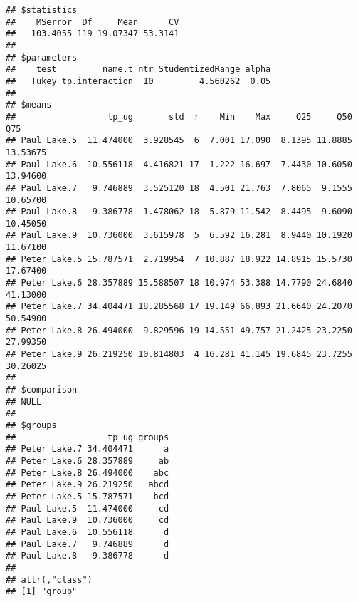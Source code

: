 \documentclass[
]{article}
\newenvironment{Shaded}{\begin{snugshade}}{\end{snugshade}}
\newcommand{\CommentTok}[1]{\textcolor[rgb]{0.56,0.35,0.01}{\textit{#1}}}
\newcommand{\DataTypeTok}[1]{\textcolor[rgb]{0.13,0.29,0.53}{#1}}
\newcommand{\FloatTok}[1]{\textcolor[rgb]{0.00,0.00,0.81}{#1}}
\newcommand{\KeywordTok}[1]{\textcolor[rgb]{0.13,0.29,0.53}{\textbf{#1}}}
\newcommand{\NormalTok}[1]{#1}
\newcommand{\OperatorTok}[1]{\textcolor[rgb]{0.81,0.36,0.00}{\textbf{#1}}}
\newcommand{\OtherTok}[1]{\textcolor[rgb]{0.56,0.35,0.01}{#1}}
\newcommand{\StringTok}[1]{\textcolor[rgb]{0.31,0.60,0.02}{#1}}
\begin{document}
\begin{Shaded}
\end{Shaded}

\begin{verbatim}
## $statistics
##    MSerror  Df     Mean      CV
##   103.4055 119 19.07347 53.3141
## 
## $parameters
##    test         name.t ntr StudentizedRange alpha
##   Tukey tp.interaction  10         4.560262  0.05
## 
## $means
##                  tp_ug       std  r    Min    Max     Q25     Q50      Q75
## Paul Lake.5  11.474000  3.928545  6  7.001 17.090  8.1395 11.8885 13.53675
## Paul Lake.6  10.556118  4.416821 17  1.222 16.697  7.4430 10.6050 13.94600
## Paul Lake.7   9.746889  3.525120 18  4.501 21.763  7.8065  9.1555 10.65700
## Paul Lake.8   9.386778  1.478062 18  5.879 11.542  8.4495  9.6090 10.45050
## Paul Lake.9  10.736000  3.615978  5  6.592 16.281  8.9440 10.1920 11.67100
## Peter Lake.5 15.787571  2.719954  7 10.887 18.922 14.8915 15.5730 17.67400
## Peter Lake.6 28.357889 15.588507 18 10.974 53.388 14.7790 24.6840 41.13000
## Peter Lake.7 34.404471 18.285568 17 19.149 66.893 21.6640 24.2070 50.54900
## Peter Lake.8 26.494000  9.829596 19 14.551 49.757 21.2425 23.2250 27.99350
## Peter Lake.9 26.219250 10.814803  4 16.281 41.145 19.6845 23.7255 30.26025
## 
## $comparison
## NULL
## 
## $groups
##                  tp_ug groups
## Peter Lake.7 34.404471      a
## Peter Lake.6 28.357889     ab
## Peter Lake.8 26.494000    abc
## Peter Lake.9 26.219250   abcd
## Peter Lake.5 15.787571    bcd
## Paul Lake.5  11.474000     cd
## Paul Lake.9  10.736000     cd
## Paul Lake.6  10.556118      d
## Paul Lake.7   9.746889      d
## Paul Lake.8   9.386778      d
## 
## attr(,"class")
## [1] "group"
\end{verbatim}
\end{document}
